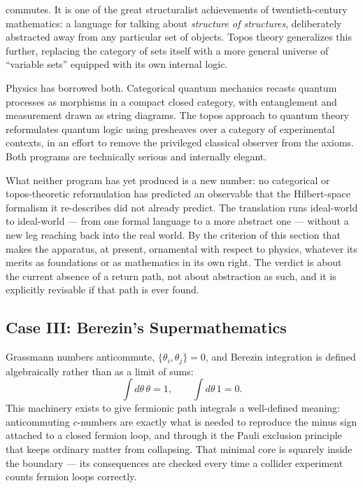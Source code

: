 commutes. It is one of the great
structuralist achievements of twentieth-century mathematics: a language for
talking about \emph{structure of structures}, deliberately abstracted away from
any particular set of objects. Topos theory generalizes this further, replacing
the category of sets itself with a more general universe of ``variable sets''
equipped with its own internal logic.

Physics has borrowed both. Categorical quantum mechanics recasts quantum
processes as morphisms in a compact closed category, with entanglement and
measurement drawn as string diagrams. The topos approach to quantum theory
reformulates quantum logic using presheaves over a category of experimental
contexts, in an effort to remove the privileged classical observer from the
axioms. Both programs are technically serious and internally elegant.

What neither program has yet produced is a new number: no categorical or
topos-theoretic reformulation has predicted an observable that the
Hilbert-space formalism it re-describes did not already predict. The
translation runs ideal-world to ideal-world --- from one formal language to a
more abstract one --- without a new leg reaching back into the real world. By
the criterion of this section that makes the apparatus, at present, ornamental
with respect to physics, whatever its merits as foundations or as mathematics
in its own right. The verdict is about the current absence of a return path,
not about abstraction as such, and it is explicitly revisable if that path is
ever found.

\subsection{Case III: Berezin's Supermathematics }

Grassmann numbers anticommute, $\{\theta_i,\theta_j\}=0$, and Berezin
integration is defined algebraically rather than as a limit of sums:
\[
\int d\theta\,\theta = 1, \qquad \int d\theta\, 1 = 0 .
\]
This machinery exists to give fermionic path integrals a well-defined meaning:
anticommuting $c$-numbers are exactly what is needed to reproduce the minus
sign attached to a closed fermion loop, and through it the Pauli exclusion
principle that keeps ordinary matter from collapsing. That minimal core is
squarely inside the boundary --- its consequences are checked every time a
collider experiment counts fermion loops correctly.


